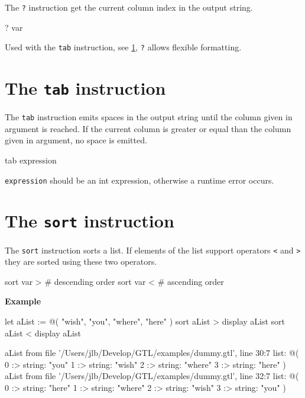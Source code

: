\documentclass[10pt,openright,twosides,final]{memoir}
\newcommand{\gtltype}[1]{{\small\ttfamily #1}}
\newcommand{\gtlinline}[1]{\colorbox{light-blue}{\lstinline[language=gtl]{#1}}}
\newcommand{\example}{\vspace{.75em}\noindent\textbf{Example}\vspace{0em}}
\begin{document}
The \gtlinline{?} instruction get the current column index in the output string.

\begin{gtl}
? var
\end{gtl}

Used with the \gtlinline{tab} instruction, see \ref{sec:tab}, \gtlinline{?} allows flexible formatting.

\section{The \texttt{tab} instruction}
\label{sec:tab}

The \gtlinline{tab} instruction emits spaces in the output string until the column given in argument is reached. If the current column is greater or equal than the column given in argument, no space is emitted.

\begin{gtl}
tab expression
\end{gtl}

\gtlinline{expression} should be an \gtltype{int} expression, otherwise a runtime error occurs.

\section{The \texttt{sort} instruction}

The \gtlinline{sort} instruction sorts a \gtltype{list}. If elements of the list support operators \gtlinline{<} and \gtlinline{>} they are sorted using these two operators.

\begin{gtl}
sort var > # descending order
sort var < # ascending order
\end{gtl}

\example
\begin{gtl}
let aList := @( "wish", "you", "where", "here" )
sort aList >
display aList
sort aList <
display aList
\end{gtl}
\begin{console}
aList from file '/Users/jlb/Develop/GTL/examples/dummy.gtl', line 30:7
    list: @(
        0 :>
            string: "you"
        1 :>
            string: "wish"
        2 :>
            string: "where"
        3 :>
            string: "here"
    )
aList from file '/Users/jlb/Develop/GTL/examples/dummy.gtl', line 32:7
    list: @(
        0 :>
            string: "here"
        1 :>
            string: "where"
        2 :>
            string: "wish"
        3 :>
            string: "you"
    )
\end{console}
\end{document}
